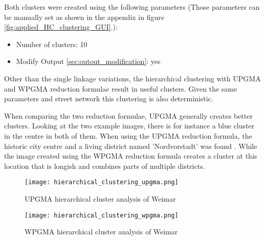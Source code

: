 Both clusters were created using the following parameters (Those parameters can be manually set as shown in the appendix in figure \ref{fig:applied_HC_clustering_GUI}.):

\begin{itemize}
    \item Number of clusters: 10
    \item Modify Output \ref{sec:outout_modification}: yes
\end{itemize}

Other than the single linkage variations, the hierarchical clustering with \acrshort{UPGMA} and \acrshort{WPGMA} reduction formulae result in useful clusters. Given the same parameters and street network this clustering is also deterministic.

When comparing the two reduction formulae, \acrshort{UPGMA} generally creates better clusters. Looking at the two example images, there is for instance a blue cluster in the centre in both of them. When using the \acrshort{UPGMA} reduction formula, the historic city centre and a living district named 'Nordvorstadt' was found \cite{weimar.de}. While the image created using the \acrshort{WPGMA} reduction formula creates a cluster at this location that is longish and combines parts of multiple districts.

\begin{figure}
    \centering
    \begin{mdframed}[style=mdthight]
        \texttt{[image: hierarchical\_clustering\_upgma.png]}
    \end{mdframed}
    \caption{UPGMA hierarchical cluster analysis of Weimar\label{fig:hierarchical_clustering_upgma}}
\end{figure}


\begin{figure}
    \centering
    \begin{mdframed}[style=mdthight]
        \texttt{[image: hierarchical\_clustering\_wpgma.png]}
    \end{mdframed}
    \caption{WPGMA hierarchical cluster analysis of Weimar\label{fig:hierarchical_clustering_wpgma}}
\end{figure}
